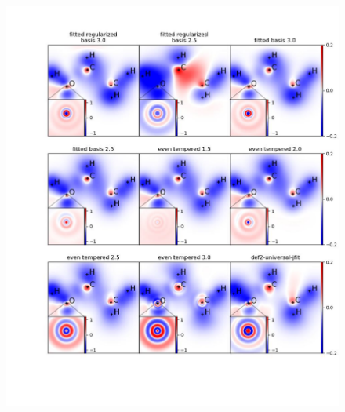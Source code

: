  \begin{figure}
   \centering
   \includegraphics{chapters/results/results_images/density_fitting_slices2}
 \end{figure}
 







